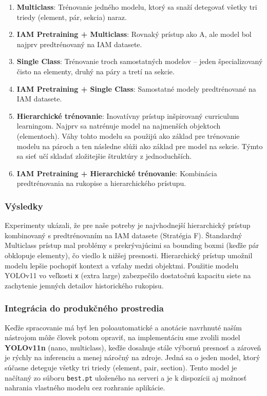 \begin{enumerate}[label=\Alph*.]
    \item \textbf{Multiclass}: Trénovanie jedného modelu, ktorý sa snaží detegovať všetky tri triedy (element, pár, sekcia) naraz.
    \item \textbf{IAM Pretraining + Multiclass}: Rovnaký prístup ako A, ale model bol najprv predtrénovaný na IAM datasete.
    \item \textbf{Single Class}: Trénovanie troch samostatných modelov – jeden špecializovaný čisto na elementy, druhý na páry a tretí na sekcie.
    \item \textbf{IAM Pretraining + Single Class}: Samostatné modely predtrénované na IAM datasete.
    \item \textbf{Hierarchické trénovanie}: Inovatívny prístup inšpirovaný curriculum learningom. Najprv sa natrénuje model na najmenších objektoch (elementoch). Váhy tohto modelu sa použijú ako základ pre trénovanie modelu na pároch a ten následne slúži ako základ pre model na sekcie. Týmto sa sieť učí skladať zložitejšie štruktúry z jednoduchších.
    \item \textbf{IAM Pretraining + Hierarchické trénovanie}: Kombinácia predtrénovania na rukopise a hierarchického prístupu.
\end{enumerate}

\subsubsection{Výsledky}

Experimenty ukázali, že pre naše potreby je najvhodnejší hierarchický prístup kombinovaný s predtrénovaním na IAM datasete (Stratégia F). Štandardný Multiclass prístup mal problémy s prekrývajúcimi sa bounding boxmi (keďže pár obklopuje elementy), čo viedlo k nižšej presnosti. Hierarchický prístup umožnil modelu lepšie pochopiť kontext a vzťahy medzi objektmi. Použitie modelu YOLOv11 vo veľkosti \texttt{x} (extra large) zabezpečilo dostatočnú kapacitu siete na zachytenie jemných detailov historického rukopisu.

\subsubsection{Integrácia do produkčného prostredia}

Keďže spracovanie má byť len poloautomatické a anotácie navrhnuté naším nástrojom môže človek potom opraviť, na implementáciu sme zvolili model \textbf{YOLOv11n} (nano, multiclass), keďže dosahuje stále výbornú presnosť a zároveň je rýchly na inferenciu a menej náročný na zdroje. Jedná sa o jeden model, ktorý súčasne deteguje všetky tri triedy (element, pair, section). Tento model je načítaný zo súboru \texttt{best.pt} uloženého na serveri a je k dispozícii aj možnosť nahrania vlastného modelu cez rozhranie aplikácie.

